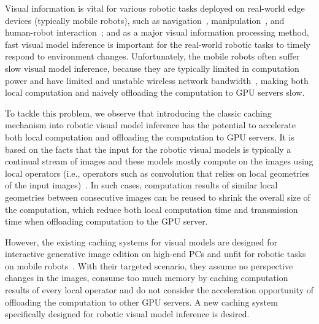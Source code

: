 Visual information is vital for various robotic tasks deployed on real-world edge devices (typically mobile robots), such as navigation~\cite{ran2017convolutional}, manipulation~\cite{bayar2018constrained}, and human-robot interaction~\cite{wu2019weight};
and as a major visual information processing method, fast visual model inference is important for the real-world robotic tasks to timely respond to environment changes. 
Unfortunately, the mobile robots often suffer slow visual model inference, because they are typically limited in computation power and have limited and unstable wireless network bandwidth~\cite{yang2022mobile}, making both local computation and naively offloading the computation to GPU servers slow.

To tackle this problem, we observe that introducing the classic caching mechanism into robotic visual model inference has the potential to accelerate both local computation and offloading the computation to GPU servers.
It is based on the facts that the input for the robotic visual models is typically a continual stream of images and these models mostly compute on the images using local operators (i.e., operators such as convolution that relies on local geometries of the input images)~\cite{o2015introduction,tripp2019approximating}.
In such cases, computation results of similar local geometries between consecutive images can be reused to shrink the overall size of the computation, which reduce both local computation time and transmission time when offloading computation to the GPU server.

However, the existing caching systems for visual models are designed for interactive generative image edition on high-end PCs and unfit for robotic tasks on mobile robots~\cite{li_efficient_2023}.
With their targeted scenario, they assume no perspective changes in the images, consume too much memory by caching computation results of every local operator and do not consider the acceleration opportunity of offloading the computation to other GPU servers.
A new caching system specifically designed for robotic visual model inference is desired.


